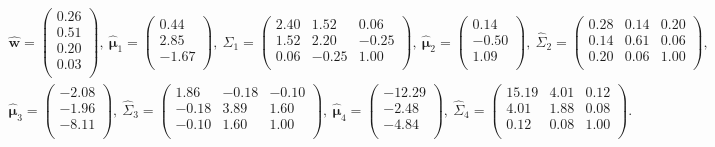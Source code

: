 \documentclass[a4j,11pt]{jarticle}
\begin{document}
\vspace{-1.5zh}
\begin{equation}
\label{parameter}
\begin{split}
\hat {\bm w} = \begin{pmatrix} 0.26 \\ 0.51 \\ 0.20 \\ 0.03 \\ \end{pmatrix},\ 
\hat{\bm \mu}_1 = \begin{pmatrix} 0.44 \\ 2.85 \\ -1.67 \\ \end{pmatrix},\ 
\hat \Sigma_1 = \begin{pmatrix}  2.40 & 1.52 &  0.06 \\ 1.52 & 2.20 & -0.25 \\ 0.06 & -0.25 &1.00 \\ \end{pmatrix},\ 
\hat{\bm \mu}_2 = \begin{pmatrix} 0.14 \\ -0.50 \\ 1.09 \\ \end{pmatrix},\ 
\hat \Sigma_2 = \begin{pmatrix}   0.28  & 0.14 &  0.20 \\ 0.14 & 0.61 & 0.06 \\  0.20 & 0.06 &1.00 \\ \end{pmatrix}, \\
\hat{\bm \mu}_3 = \begin{pmatrix} -2.08  \\ -1.96 \\ -8.11 \\ \end{pmatrix},\ 
\hat \Sigma_3 = \begin{pmatrix}  1.86  & -0.18 &  -0.10 \\-0.18 & 3.89 & 1.60 \\  -0.10 & 1.60 & 1.00 \\ \end{pmatrix},\ 
\hat{\bm \mu}_4 = \begin{pmatrix} -12.29   \\ -2.48 \\ -4.84 \\ \end{pmatrix},\ 
\hat \Sigma_4 = \begin{pmatrix} 15.19 & 4.01 &  0.12 \\ 4.01 & 1.88 & 0.08 \\ 0.12 & 0.08 &1.00 \\ \end{pmatrix}.
\end{split}
\end{equation}
\end{document}
